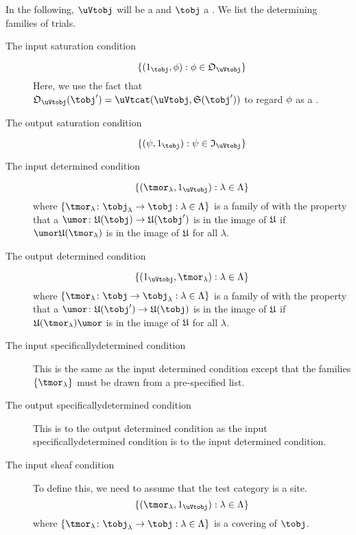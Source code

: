 \documentclass[%
12pt,%
arxiv,%
defaults
]{myclass}
\begin{document}
\begin{defn}
In the following, \(\uVtobj\) will be a \uVtobj and \(\tobj\) a \tobj.
We list the determining families of trials.

\begin{description}
\item[The input saturation condition]
%
\[
  \{(1_{\tobj}, \ofn) : \ofn \in \otest_{\uVtobj}\}
\]
%
Here, we use the fact that \(\otest_{\uVtobj}(\tobj') = \Hom{\uVtcat}{\uVtobj}{\sfunc(\tobj')}\) to regard \(\phi\) as a \uVtmor.

\item[The output saturation condition]
%
\[
  \{(\ifn, 1_{\tobj}) : \ifn \in \itest_{\uVtobj}\}
\]
%

\item[The input determined condition]
%
\[
  \{(\tmor_\lambda, 1_{\uVtobj}) : \lambda \in \Lambda\}
\]
%
where \(\{\tmor_\lambda \colon \tobj_\lambda \to \tobj : \lambda \in \Lambda\}\) is a family of \tmors with the property that a \umor \(\umor \colon \ufunc(\tobj) \to \ufunc(\tobj')\) is in the image of \(\ufunc\) if \(\umor \ufunc(\tmor_\lambda)\) is in the image of \(\ufunc\) for all \(\lambda\).

\item[The output determined condition]
%
\[
  \{(1_{\uVtobj}, \tmor_\lambda) : \lambda \in \Lambda\}
\]
%
where \(\{\tmor_\lambda \colon \tobj \to \tobj_\lambda : \lambda \in \Lambda\}\) is a family of \tmors with the property that a \umor \(\umor \colon \ufunc(\tobj') \to \ufunc(\tobj)\) is in the image of \(\ufunc\) if \( \ufunc(\tmor_\lambda) \umor\) is in the image of \(\ufunc\) for all \(\lambda\).

\item[The input specifically\enhyp{}determined condition]
This is the same as the input determined condition except that the families \(\{\tmor_\lambda\}\) must be drawn from a pre\hyp{}specified list.

\item[The output specifically\enhyp{}determined condition]
This is to the output determined condition as the input specifically\enhyp{}determined condition is to the input determined condition.

\item[The input sheaf condition]
To define this, we need to assume that the test category is a site.
%
\[
  \{(\tmor_\lambda, 1_{\uVtobj}) : \lambda \in \Lambda\}
\]
%
where \(\{\tmor_\lambda \colon \tobj_\lambda \to \tobj : \lambda \in \Lambda\}\) is a covering of \(\tobj\).


\end{description}
\end{defn}
\end{document}
